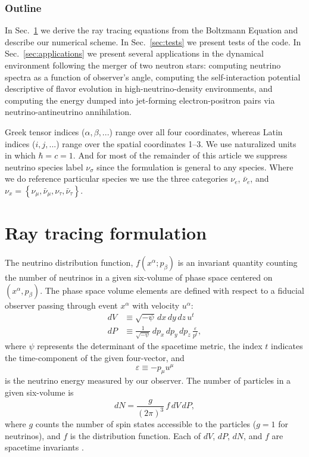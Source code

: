 \documentclass[aps,floatfix,prd,superscriptaddress,twocolumn]{revtex4-1}
\begin{document}
\subsubsection*{Outline}
In Sec.~\ref{sec:formulation} we derive the ray tracing equations from the
Boltzmann Equation and describe our numerical scheme.
In Sec.~\ref{sec:tests} we present tests of the code.
In Sec.~\ref{sec:applications} we present several applications
in the dynamical environment following the merger of two neutron stars:
computing neutrino spectra as a function of observer's angle,
computing the self-interaction potential descriptive of flavor evolution
in high-neutrino-density environments,
and computing the energy dumped into jet-forming electron-positron
pairs via neutrino-antineutrino annihilation.

Greek tensor indices ($\alpha, \beta, ...$) range over all four coordinates,
whereas Latin indices ($i, j, ...$) range over the spatial coordinates 1--3.
We use naturalized units in which $\hbar=c=1$.
And for most of the remainder of this article we suppress neutrino species label
$\nu_\sigma$ since the formulation is general to any species.
Where we do reference particular species we use the three categories
$\nu_e$, $\bar{\nu}_e$, and
$\nu_x=\left\{\nu_\mu,\bar{\nu}_\mu,\nu_\tau,\bar{\nu}_\tau\right\}$.

\section{Ray tracing formulation}
\label{sec:formulation}
The neutrino distribution function, $f(x^\alpha; p_\beta)$ is an invariant
quantity counting the number of neutrinos in a given six-volume of phase
space centered on $(x^\alpha,p_\beta)$.
The phase space volume elements are defined with respect to a fiducial
observer passing through event $x^\alpha$ with velocity $u^\alpha$:
\begin{align}
  \label{eqn:dV}
  dV & \equiv \sqrt{-\psi} \, dx \, dy \, dz \, u^t \\
  \label{eqn:dP}
  dP & \equiv \frac{1}{\sqrt{-\psi}} \, dp_x \, dp_y \, dp_z \,
  \frac{\varepsilon}{p^t},
\end{align}
where $\psi$ represents the determinant of the spacetime metric,
the index $t$ indicates the time-component of the given four-vector, and
\begin{equation}
  \label{eqn:varepsilon}
  \varepsilon \equiv -p_\mu u^\mu
\end{equation}
is the neutrino energy measured by our observer.
The number of particles in a given six-volume is
\begin{equation}
  dN=\frac{g}{(2\pi)^3}\,f\,dV\,dP,
\end{equation}
where $g$ counts the number of spin states accessible to the
particles ($g=1$ for neutrinos), and $f$ is the distribution function.
Each of $dV$, $dP$, $dN$, and $f$ are spacetime invariants
\citep{debb2009-gr_boltzmann_1, debb2009-gr_boltzmann_2, lind1966-gr_boltzmann}.
\end{document}
